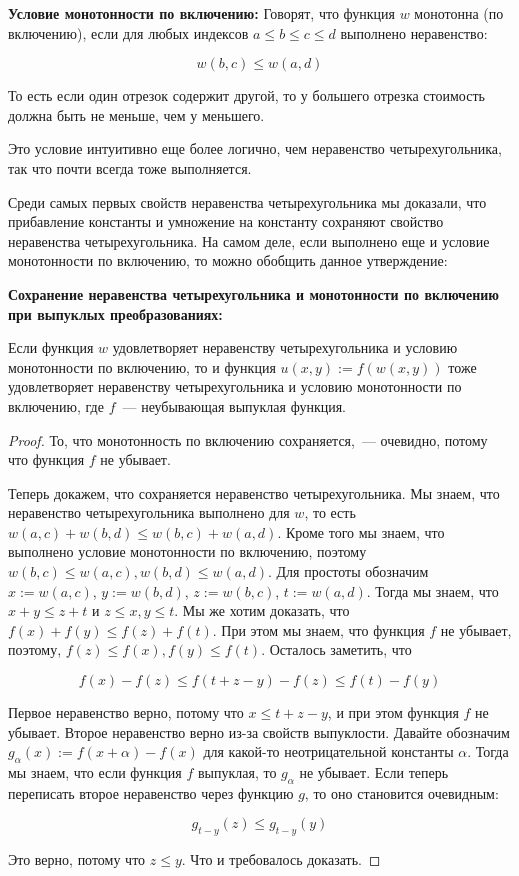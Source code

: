 \textbf{Условие монотонности по включению:} Говорят, что функция $w$ монотонна (по включению), если для любых индексов $a \le b \le c \le d$ выполнено неравенство:

$$w(b, c) \le w(a, d)$$

То есть если один отрезок содержит другой, то у большего отрезка стоимость должна быть не меньше, чем у меньшего.

Это условие интуитивно еще более  логично, чем неравенство четырехугольника, так что почти всегда тоже выполняется.


Среди самых первых свойств неравенства четырехугольника мы доказали, что прибавление константы и умножение на константу сохраняют свойство неравенства четырехугольника. На самом деле, если выполнено еще и условие монотонности по включению, то можно обобщить данное утверждение:

\begin{proposition} \textbf{Сохранение неравенства четырехугольника и монотонности по включению при выпуклых преобразованиях:}

    Если функция $w$ удовлетворяет неравенству четырехугольника и условию монотонности по включению, то и функция $u(x, y) := f(w(x, y))$ тоже удовлетворяет неравенству четырехугольника и условию монотонности по включению, где $f$~--- неубывающая выпуклая функция.
\end{proposition}

\begin{proof}
    То, что монотонность по включению сохраняется,~--- очевидно, потому что функция $f$ не убывает.

    Теперь докажем, что сохраняется неравенство четырехугольника. Мы знаем, что неравенство четырехугольника выполнено для $w$, то есть $w(a, c) + w(b, d) \le w(b, c) + w(a, d)$. Кроме того мы знаем, что выполнено условие монотонности по включению, поэтому $w(b, c) \le w(a, c), w(b, d) \le w(a, d)$. Для простоты обозначим $x := w(a, c)$, $y := w(b, d)$, $z := w(b, c)$, $t := w(a, d)$. Тогда мы знаем, что $x + y \le z + t$ и $z \le x, y \le t$. Мы же хотим доказать, что $f(x) + f(y) \le f(z) + f(t)$. При этом мы знаем, что функция $f$ не убывает, поэтому, $f(z) \le f(x), f(y) \le f(t)$. Осталось заметить, что

$$f(x) - f(z) \le f(t + z - y) - f(z) \le f(t) - f(y)$$

Первое неравенство верно, потому что $x \le t + z - y$, и при этом функция $f$ не убывает. Второе неравенство верно из-за свойств выпуклости. Давайте обозначим $g_{\alpha}(x) := f(x + \alpha) - f(x)$ для какой-то неотрицательной константы $\alpha$. Тогда мы знаем, что если функция $f$ выпуклая, то $g_{\alpha}$ не убывает. Если теперь переписать второе неравенство через функцию $g$, то оно становится очевидным:

$$g_{t - y}(z) \le g_{t - y}(y)$$

Это верно, потому что $z \le y$. Что и требовалось доказать.
\end{proof}

